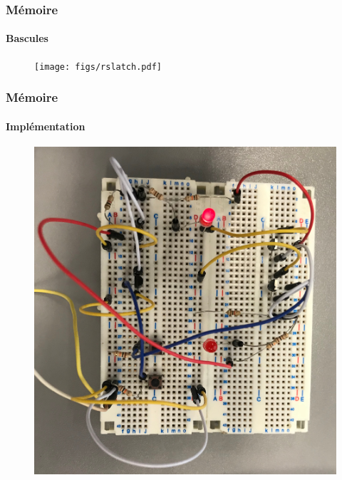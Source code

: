 
\begin{frame}

  \frametitle{Mémoire}
  \framesubtitle{Bascules}

  \begin{figure}
    \centering
    \texttt{[image: figs/rslatch.pdf]}
  \end{figure}

\end{frame}


\begin{frame}

  \frametitle{Mémoire}
  \framesubtitle{Implémentation}

  \begin{figure}

    \centering
    \includegraphics[width=0.7\linewidth]{pics/rslatch.jpg}
  \end{figure}


\end{frame}
